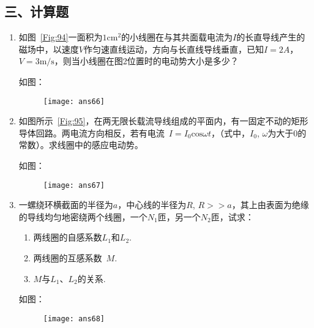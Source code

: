 \subsection*{三、计算题}
\begin{enumerate}
    \item 如图~\ref{Fig:94}一面积为$1\mathrm{cm}^2$的小线圈在与其共面载电流为$I$的长直导线产生的磁场中，以速度$V$作匀速直线运动，方向与长直线导线垂直，已知$I=2A$，$V=3\mathrm{m/s}$，则当小线圈在图2位置时的电动势大小是多少？
    \begin{solution}
        如图：
        \begin{figure}[H]
            \centering
            \texttt{[image: ans66]}
        \end{figure}
    \end{solution}
    \item 如图所示~\ref{Fig:95}，在两无限长载流导线组成的平面内，有一固定不动的矩形导体回路。两电流方向相反，若有电流~$I=I_0\mathrm{cos}\omega t$，（式中，$I_0$, $\omega$为大于0的常数）。求线圈中的感应电动势。
    \begin{solution}
        如图：
        \begin{figure}[H]
            \centering
            \texttt{[image: ans67]}
        \end{figure}
    \end{solution}
    \item 一螺绕环横截面的半径为$a$，中心线的半径为$R$, $R>>a$，其上由表面为绝缘的导线均匀地密绕两个线圈，一个$N_1$匝，另一个$N_2$匝，试求：
    \begin{enumerate}[label=(\arabic*)]
        \item 两线圈的自感系数$L_1$和$L_2$.
        \item 两线圈的互感系数~$M$.
        \item $M$与$L_1$、$L_2$的关系.
    \end{enumerate}
    \begin{solution}
        如图：
        \begin{figure}[H]
            \centering
            \texttt{[image: ans68]}
        \end{figure}
    \end{solution}
\end{enumerate}